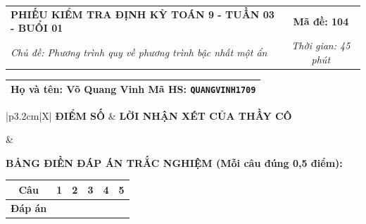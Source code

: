 \documentclass[12pt,a4paper]{article}
\begin{document}
\newpage


\noindent
\begin{tabularx}{\linewidth}{|X|c|}
\hline
\textbf{PHIẾU KIỂM TRA ĐỊNH KỲ TOÁN 9 - TUẦN 03 - BUỔI 01} & \textbf{Mã đề: 104} \\
\textit{Chủ đề: Phương trình quy về phương trình bậc nhất một ẩn} & \textit{Thời gian: 45 phút} \\
\hline
\end{tabularx}

\vspace{1mm}

\noindent
\begin{tabularx}{\linewidth}{|X|}
\hline
\rule[-2mm]{0pt}{7.5mm}\textbf{Họ và tên:} \textbf{\large Võ Quang Vinh} \hfill \textbf{Mã HS:} \texttt{QUANGVINH1709} \quad \\
\hline
\end{tabularx}

\vspace{1mm}

\noindent
\begin{tabularx}{\linewidth}{|p{3.2cm}|X|}
\hline
\centering\textbf{ĐIỂM SỐ} & \centering\textbf{LỜI NHẬN XÉT CỦA THẦY CÔ} \tabularnewline
\hline
\rule{0pt}{1.3cm} & \tabularnewline
\hline
\end{tabularx}

\vspace{1.2mm}

\noindent\textbf{BẢNG ĐIỀN ĐÁP ÁN TRẮC NGHIỆM (Mỗi câu đúng 0,5 điểm):}
\vspace{0.8mm}

\noindent
\renewcommand{\arraystretch}{1.35}
\begin{tabularx}{\linewidth}{|c|*{5}{>{\centering\arraybackslash}X|}}
\hline
\textbf{Câu} & \textbf{1} & \textbf{2} & \textbf{3} & \textbf{4} & \textbf{5} \\
\hline
\textbf{Đáp án} & & & & & \\
\hline
\end{tabularx}
\renewcommand{\arraystretch}{1.0}

\vspace{1.5mm}
\end{document}
